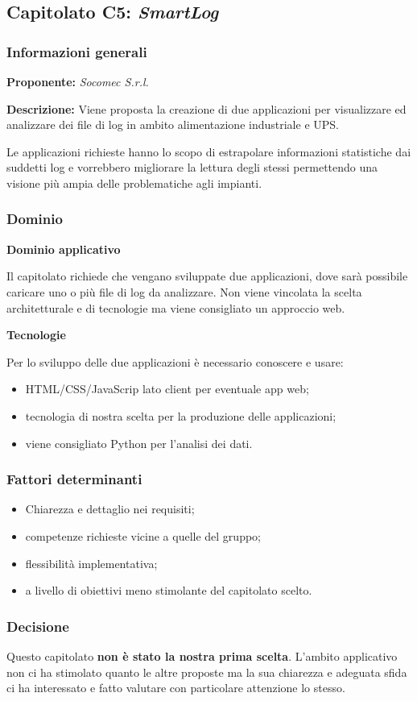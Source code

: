 \subsection{Capitolato C5: \textit{SmartLog}}

\subsubsection{Informazioni generali}

\textbf{Proponente:} \textit{Socomec S.r.l.}

\textbf{Descrizione:} Viene proposta la creazione di due applicazioni per visualizzare ed analizzare dei file di log in ambito alimentazione industriale e UPS.

Le applicazioni richieste hanno lo scopo di estrapolare informazioni statistiche dai suddetti log e vorrebbero migliorare la lettura degli stessi permettendo una visione più ampia delle problematiche agli impianti.

\subsubsection{Dominio}

\textbf{Dominio applicativo}

Il capitolato richiede che vengano sviluppate due applicazioni, dove sarà possibile caricare uno o più file di log da analizzare. Non viene vincolata la scelta architetturale e di tecnologie ma viene consigliato un approccio web.

\textbf{Tecnologie}

Per lo sviluppo delle due applicazioni è necessario conoscere e usare:
\begin{itemize}
    \item HTML/CSS/JavaScrip lato client per eventuale app web;
    \item tecnologia di nostra scelta per la produzione delle applicazioni;
    \item viene consigliato Python per l'analisi dei dati.
\end{itemize}

\subsubsection{Fattori determinanti}
\begin{itemize}
    \item Chiarezza e dettaglio nei requisiti;
    \item competenze richieste vicine a quelle del gruppo;
    \item flessibilità implementativa;
    \item a livello di obiettivi meno stimolante del capitolato scelto.
\end{itemize}

\subsubsection{Decisione}

Questo capitolato \textbf{non è stato la nostra prima scelta}. L'ambito applicativo non ci ha stimolato quanto le altre proposte ma la sua chiarezza e adeguata sfida ci ha interessato e fatto valutare con particolare attenzione lo stesso.